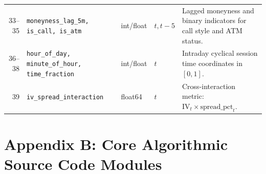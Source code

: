 \begin{table}[H]
\begin{tabularx}{\textwidth}{rllp{2.0cm}X}
        33--35 & \texttt{moneyness\_lag\_5m, is\_call, is\_atm} & int/float & $t, t-5$ & Lagged moneyness and binary indicators for call style and ATM status. \\
        36--38 & \texttt{hour\_of\_day, minute\_of\_hour, time\_fraction} & int/float & $t$ & Intraday cyclical session time coordinates in $[0, 1]$. \\
        39 & \texttt{iv\_spread\_interaction} & float64 & $t$ & Cross-interaction metric: $\text{IV}_t \times \text{spread\_pct}_t$. \\
        \bottomrule
    \end{tabularx}
\end{table}

\vspace{-0.3cm}
\section{Appendix B: Core Algorithmic Source Code Modules}
\label{sec:appendix_source_code}


